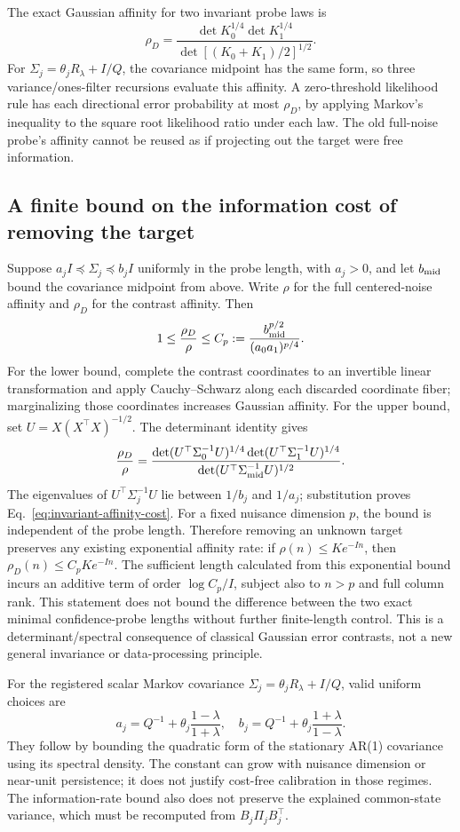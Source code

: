The exact Gaussian affinity for two invariant probe laws is
\[
\rho_D=\frac{\det K_0^{1/4}\det K_1^{1/4}}
{\det[(K_0+K_1)/2]^{1/2}}.
\]
For $\Sigma_j=\theta_jR_\lambda+I/Q$, the covariance midpoint has the same form, so three variance/ones-filter recursions evaluate this affinity.
A zero-threshold likelihood rule has each directional error probability at most $\rho_D$, by applying Markov's inequality to the square root likelihood ratio under each law.
The old full-noise probe's affinity cannot be reused as if projecting out the target were free information.

\subsection{A finite bound on the information cost of removing the target}
Suppose $a_jI\preceq\Sigma_j\preceq b_jI$ uniformly in the probe length, with $a_j>0$, and let $b_{\rm mid}$ bound the covariance midpoint from above.
Write $\rho$ for the full centered-noise affinity and $\rho_D$ for the contrast affinity.
Then
\begin{equation}
1\le\frac{\rho_D}{\rho}
\le C_p:=\frac{b_{\rm mid}^{p/2}}{(a_0a_1)^{p/4}}.
\label{eq:invariant-affinity-cost}
\end{equation}
For the lower bound, complete the contrast coordinates to an invertible linear transformation and apply Cauchy--Schwarz along each discarded coordinate fiber; marginalizing those coordinates increases Gaussian affinity.
For the upper bound, set $U=X(X^\top X)^{-1/2}$.
The determinant identity gives
\[
\frac{\rho_D}{\rho}=
\frac{\det(U^\top\Sigma_0^{-1}U)^{1/4}
\det(U^\top\Sigma_1^{-1}U)^{1/4}}
{\det(U^\top\Sigma_{\rm mid}^{-1}U)^{1/2}}.
\]
The eigenvalues of $U^\top\Sigma_j^{-1}U$ lie between $1/b_j$ and $1/a_j$; substitution proves Eq.~\eqref{eq:invariant-affinity-cost}.
For a fixed nuisance dimension $p$, the bound is independent of the probe length.
Therefore removing an unknown target preserves any existing exponential affinity rate: if $\rho(n)\le Ke^{-In}$, then $\rho_D(n)\le C_pKe^{-In}$.
The sufficient length calculated from this exponential bound incurs an additive term of order $\log C_p/I$, subject also to $n>p$ and full column rank.
This statement does not bound the difference between the two exact minimal confidence-probe lengths without further finite-length control.
This is a determinant/spectral consequence of classical Gaussian error contrasts, not a new general invariance or data-processing principle.

For the registered scalar Markov covariance $\Sigma_j=\theta_jR_\lambda+I/Q$, valid uniform choices are
\[
a_j=Q^{-1}+\theta_j\frac{1-\lambda}{1+\lambda},\quad
b_j=Q^{-1}+\theta_j\frac{1+\lambda}{1-\lambda}.
\]
They follow by bounding the quadratic form of the stationary AR(1) covariance using its spectral density.
The constant can grow with nuisance dimension or near-unit persistence; it does not justify cost-free calibration in those regimes.
The information-rate bound also does not preserve the explained common-state variance, which must be recomputed from $B_j\Pi_jB_j^\top$.

